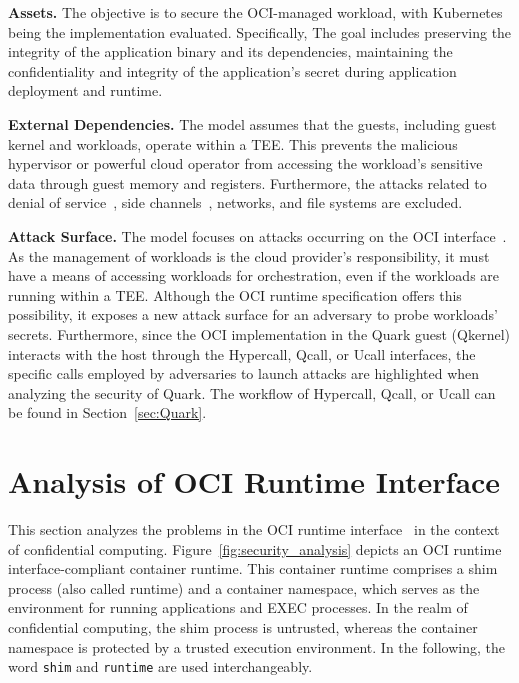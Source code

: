 \textbf{Assets.} The objective is to secure the OCI-managed workload, with Kubernetes being the implementation evaluated. Specifically, The goal includes preserving the integrity of the application binary and its dependencies, maintaining the confidentiality and integrity of the application’s secret 
during application deployment and runtime.

\textbf{External Dependencies.} The model assumes that the guests, including guest kernel and workloads, operate within a \acrshort{TEE}. This prevents the malicious hypervisor or powerful cloud operator from accessing the workload’s sensitive data through guest memory and registers. Furthermore, 
the attacks related to denial of service~\cite*{DOS_ATTACK}, side channels~\cite*{217454}, networks, and file systems are excluded.

\textbf{Attack Surface.} The model focuses on attacks occurring on the OCI interface~\cite*{oci-runtime-spec}. As the management of workloads is the cloud provider’s responsibility, it must have a means of accessing workloads for orchestration, even if the workloads are running within a TEE. Although the OCI runtime specification offers this possibility, 
it exposes a new attack surface for an adversary to probe workloads’ secrets. Furthermore, since the OCI implementation in the Quark guest (Qkernel) interacts with the host through the Hypercall, Qcall, or Ucall interfaces, the specific calls employed by adversaries to launch attacks are highlighted when analyzing the security of Quark.
The workflow of Hypercall, Qcall, or Ucall can be found in Section~\ref{sec:Quark}.



\section{Analysis of OCI Runtime Interface}
\label{sec:security_analyse_oci_analysis}
This section analyzes the problems in the OCI runtime interface~\cite*{oci-runtime-spec} in the context of confidential computing.  Figure~\ref{fig:security_analysis} depicts an OCI  runtime interface-compliant container runtime. This container runtime comprises a shim process (also called runtime) and a container namespace, which serves as the environment for running applications and EXEC processes. In the realm of confidential computing, the shim process is untrusted, whereas the container namespace is protected by a 
trusted execution environment. In the following, the word \texttt{shim} and \texttt{runtime} are used interchangeably.


